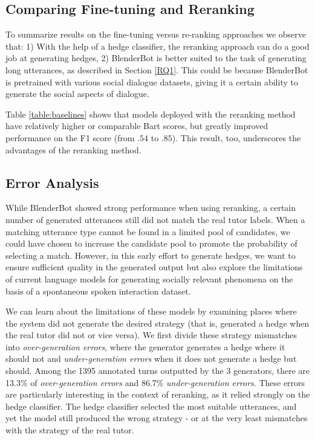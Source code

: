 \documentclass[11pt]{article}
\begin{document}
\subsection{Comparing Fine-tuning and Reranking}

To summarize results on the fine-tuning versus re-ranking approaches we observe that: 1) With the help of a hedge classifier, the reranking approach can do a good job at generating hedges, 2) BlenderBot is better suited to the task of generating long utterances, as described in Section \ref{RQ1}. This could be because BlenderBot is pretrained with various social dialogue datasets, giving it a certain ability to generate the social aspects of dialogue. 

 

Table \ref{table:baselines} shows that models deployed with the reranking method have relatively higher or comparable Bart scores, but greatly improved performance on the F1 score (from $.54$ to $.85$). This result, too, underscores the advantages of the reranking method.

 
\subsection{Error Analysis}\label{error_analysis}

While BlenderBot showed strong performance when using reranking, a certain number of generated utterances still did not match the real tutor labels. When a matching utterance type cannot be found in a limited pool of candidates, we could have chosen to increase the candidate pool to promote the probability of selecting a match.  However, in this early effort to generate hedges, we want to ensure sufficient quality in the generated output but also explore the limitations of current language models for generating socially relevant phenomena on the basis of a spontaneous spoken interaction dataset.

We can learn about the limitations of these models by examining places where the system did not generate the desired strategy (that is, generated a hedge when the real tutor did not or vice versa). We first divide these strategy mismatches into \textit{over-generation errors}, where the generator generates a hedge where it should not and \textit{under-generation errors} when it does not generate a hedge but should. Among the 1395 annotated turns outputted by the 3 generators, there are 13.3\% of \textit{over-generation errors} and 86.7\% \textit{under-generation errors}. These errors are particularly interesting in the context of reranking, as it relied strongly on the hedge classifier. The hedge classifier selected the most suitable utterances, and yet the model still produced the wrong strategy - or at the very least mismatches with the strategy of the real tutor. 
\end{document}
